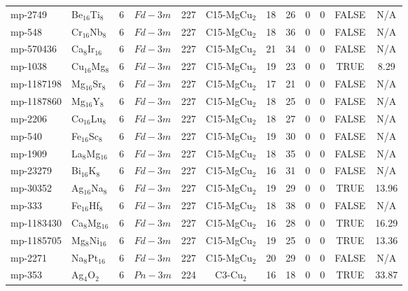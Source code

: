 {\begin{longtable}{llcccccccccc}
    mp-2749 & Be$_{16}$Ti$_{8}$ & 6     & $Fd-3m$ & 227   & C15-MgCu$_{2}$ & 18    & 26    & 0     & 0     & FALSE & N/A \\
    mp-548 & Cr$_{16}$Nb$_{8}$ & 6     & $Fd-3m$ & 227   & C15-MgCu$_{2}$ & 18    & 36    & 0     & 0     & FALSE & N/A \\
    mp-570436 & Ca$_{8}$Ir$_{16}$ & 6     & $Fd-3m$ & 227   & C15-MgCu$_{2}$ & 21    & 34    & 0     & 0     & FALSE & N/A \\
    mp-1038 & Cu$_{16}$Mg$_{8}$ & 6     & $Fd-3m$ & 227   & C15-MgCu$_{2}$ & 19    & 23    & 0     & 0     & TRUE  & 8.29  \\
    mp-1187198 & Mg$_{16}$Sr$_{8}$ & 6     & $Fd-3m$ & 227   & C15-MgCu$_{2}$ & 17    & 21    & 0     & 0     & FALSE & N/A \\
    mp-1187860 & Mg$_{16}$Y$_{8}$ & 6     & $Fd-3m$ & 227   & C15-MgCu$_{2}$ & 18    & 25    & 0     & 0     & FALSE & N/A \\
    mp-2206 & Co$_{16}$Lu$_{8}$ & 6     & $Fd-3m$ & 227   & C15-MgCu$_{2}$ & 18    & 27    & 0     & 0     & FALSE & N/A \\
    mp-540 & Fe$_{16}$Sc$_{8}$ & 6     & $Fd-3m$ & 227   & C15-MgCu$_{2}$ & 19    & 30    & 0     & 0     & FALSE & N/A \\
    mp-1909 & La$_{8}$Mg$_{16}$ & 6     & $Fd-3m$ & 227   & C15-MgCu$_{2}$ & 18    & 35    & 0     & 0     & FALSE & N/A \\
    mp-23279 & Bi$_{16}$K$_{8}$ & 6     & $Fd-3m$ & 227   & C15-MgCu$_{2}$ & 16    & 31    & 0     & 0     & FALSE & N/A \\
    mp-30352 & Ag$_{16}$Na$_{8}$ & 6     & $Fd-3m$ & 227   & C15-MgCu$_{2}$ & 19    & 29    & 0     & 0     & TRUE  & 13.96  \\
    mp-333 & Fe$_{16}$Hf$_{8}$ & 6     & $Fd-3m$ & 227   & C15-MgCu$_{2}$ & 18    & 38    & 0     & 0     & FALSE & N/A \\
    mp-1183430 & Ca$_{8}$Mg$_{16}$ & 6     & $Fd-3m$ & 227   & C15-MgCu$_{2}$ & 16    & 28    & 0     & 0     & TRUE  & 16.29  \\
    mp-1185705 & Mg$_{8}$Ni$_{16}$ & 6     & $Fd-3m$ & 227   & C15-MgCu$_{2}$ & 19    & 25    & 0     & 0     & TRUE  & 13.36  \\
    mp-2271 & Na$_{8}$Pt$_{16}$ & 6     & $Fd-3m$ & 227   & C15-MgCu$_{2}$ & 20    & 29    & 0     & 0     & FALSE & N/A \\
    mp-353 & Ag$_{4}$O$_{2}$ & 6     & $Pn-3m$ & 224   & C3-Cu$_{2}$ & 16    & 18    & 0     & 0     & TRUE  & 33.87  \\

\end{longtable}}
